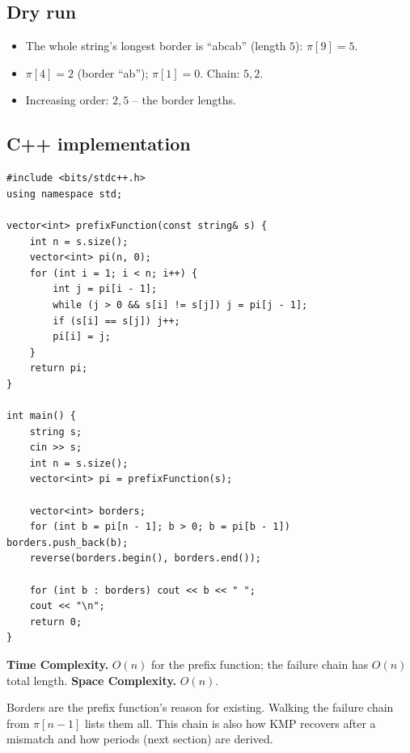 \subsection*{Dry run}


\begin{itemize}
  \item The whole string's longest border is ``abcab'' (length $5$):
        $\pi[9]=5$.
  \item $\pi[4]=2$ (border ``ab''); $\pi[1]=0$. Chain: $5,2$.
  \item Increasing order: $2,5$ -- the border lengths.
\end{itemize}

\subsection*{C++ implementation}

\begin{lstlisting}
#include <bits/stdc++.h>
using namespace std;

vector<int> prefixFunction(const string& s) {
    int n = s.size();
    vector<int> pi(n, 0);
    for (int i = 1; i < n; i++) {
        int j = pi[i - 1];
        while (j > 0 && s[i] != s[j]) j = pi[j - 1];
        if (s[i] == s[j]) j++;
        pi[i] = j;
    }
    return pi;
}

int main() {
    string s;
    cin >> s;
    int n = s.size();
    vector<int> pi = prefixFunction(s);

    vector<int> borders;
    for (int b = pi[n - 1]; b > 0; b = pi[b - 1]) borders.push_back(b);
    reverse(borders.begin(), borders.end());

    for (int b : borders) cout << b << " ";
    cout << "\n";
    return 0;
}
\end{lstlisting}

\begin{complexitybox}
\textbf{Time Complexity.} $O(n)$ for the prefix function; the failure
chain has $O(n)$ total length. \textbf{Space Complexity.} $O(n)$.
\end{complexitybox}

\begin{takeawaybox}
Borders are the prefix function's reason for existing. Walking the failure
chain from $\pi[n-1]$ lists them all. This chain is also how KMP recovers
after a mismatch and how periods (next section) are derived.
\end{takeawaybox}
